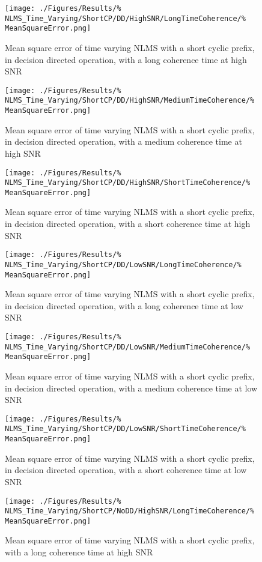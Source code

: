 \begin{figure}[ht]
	\texttt{[image: ./Figures/Results/\%
NLMS\_Time\_Varying/ShortCP/DD/HighSNR/LongTimeCoherence/\%
MeanSquareError.png]}
	\caption{Mean square error of time varying NLMS with a 
	short cyclic prefix, in decision directed operation, 
	with a long coherence time at high SNR}
\end{figure}
\begin{figure}[ht]
	\texttt{[image: ./Figures/Results/\%
NLMS\_Time\_Varying/ShortCP/DD/HighSNR/MediumTimeCoherence/\%
MeanSquareError.png]}
	\caption{Mean square error of time varying NLMS with a 
	short cyclic prefix, in decision directed operation, 
	with a medium coherence time at high SNR}
\end{figure}
\begin{figure}[ht]
	\texttt{[image: ./Figures/Results/\%
NLMS\_Time\_Varying/ShortCP/DD/HighSNR/ShortTimeCoherence/\%
MeanSquareError.png]}
	\caption{Mean square error of time varying NLMS with a 
	short cyclic prefix, in decision directed operation, 
	with a short coherence time at high SNR}
	\label{fig:NLMS-Short-High-Directed-Short}
\end{figure}
\begin{figure}[ht]
	\texttt{[image: ./Figures/Results/\%
NLMS\_Time\_Varying/ShortCP/DD/LowSNR/LongTimeCoherence/\%
MeanSquareError.png]}
	\caption{Mean square error of time varying NLMS with a 
	short cyclic prefix, in decision directed operation, 
	with a long coherence time at low SNR}
\end{figure}
\begin{figure}[ht]
	\texttt{[image: ./Figures/Results/\%
NLMS\_Time\_Varying/ShortCP/DD/LowSNR/MediumTimeCoherence/\%
MeanSquareError.png]}
	\caption{Mean square error of time varying NLMS with a 
	short cyclic prefix, in decision directed operation, 
	with a medium coherence time at low SNR}
\end{figure}
\begin{figure}[ht]
	\texttt{[image: ./Figures/Results/\%
NLMS\_Time\_Varying/ShortCP/DD/LowSNR/ShortTimeCoherence/\%
MeanSquareError.png]}
	\caption{Mean square error of time varying NLMS with a 
	short cyclic prefix, in decision directed operation, 
	with a short coherence time at low SNR}
\end{figure}
\begin{figure}[ht]
	\texttt{[image: ./Figures/Results/\%
NLMS\_Time\_Varying/ShortCP/NoDD/HighSNR/LongTimeCoherence/\%
MeanSquareError.png]}
	\caption{Mean square error of time varying NLMS with a 
	short cyclic prefix, with a long coherence time at high SNR}
\end{figure}

